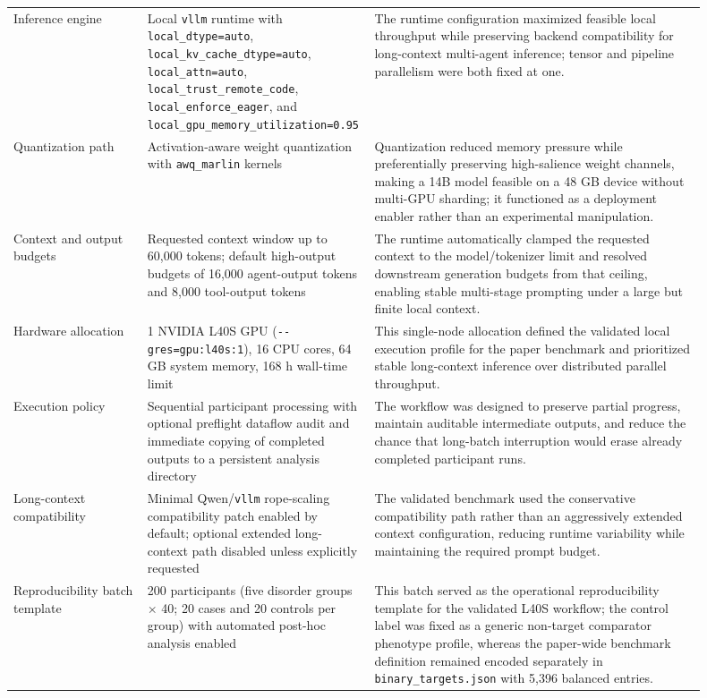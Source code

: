 \documentclass[11pt,a4paper,twoside]{article}
\begin{document}
\begin{longtable}{p{0.19\linewidth} p{0.24\linewidth} p{0.47\linewidth}}
Inference engine & Local \texttt{vllm} runtime with \nolinkurl{local_dtype=auto}, \nolinkurl{local_kv_cache_dtype=auto}, \nolinkurl{local_attn=auto}, \nolinkurl{local_trust_remote_code}, \nolinkurl{local_enforce_eager}, and \nolinkurl{local_gpu_memory_utilization=0.95} & The runtime configuration maximized feasible local throughput while preserving backend compatibility for long-context multi-agent inference; tensor and pipeline parallelism were both fixed at one. \\
Quantization path & Activation-aware weight quantization with \texttt{awq\_marlin} kernels & Quantization reduced memory pressure while preferentially preserving high-salience weight channels, making a 14B model feasible on a 48 GB device without multi-GPU sharding; it functioned as a deployment enabler rather than an experimental manipulation. \\
Context and output budgets & Requested context window up to 60,000 tokens; default high-output budgets of 16,000 agent-output tokens and 8,000 tool-output tokens & The runtime automatically clamped the requested context to the model/tokenizer limit and resolved downstream generation budgets from that ceiling, enabling stable multi-stage prompting under a large but finite local context. \\
Hardware allocation & 1 NVIDIA L40S GPU (\nolinkurl{--gres=gpu:l40s:1}), 16 CPU cores, 64 GB system memory, 168 h wall-time limit & This single-node allocation defined the validated local execution profile for the paper benchmark and prioritized stable long-context inference over distributed parallel throughput. \\
Execution policy & Sequential participant processing with optional preflight dataflow audit and immediate copying of completed outputs to a persistent analysis directory & The workflow was designed to preserve partial progress, maintain auditable intermediate outputs, and reduce the chance that long-batch interruption would erase already completed participant runs. \\
Long-context compatibility & Minimal Qwen/\texttt{vllm} rope-scaling compatibility patch enabled by default; optional extended long-context path disabled unless explicitly requested & The validated benchmark used the conservative compatibility path rather than an aggressively extended context configuration, reducing runtime variability while maintaining the required prompt budget. \\
Reproducibility batch template & 200 participants (five disorder groups $\times$ 40; 20 cases and 20 controls per group) with automated post-hoc analysis enabled & This batch served as the operational reproducibility template for the validated L40S workflow; the control label was fixed as a generic non-target comparator phenotype profile, whereas the paper-wide benchmark definition remained encoded separately in \nolinkurl{binary_targets.json} with 5,396 balanced entries. \\
\end{longtable}
\end{document}
